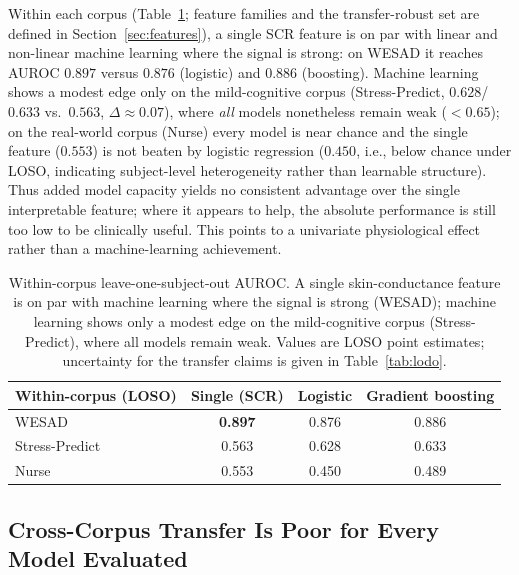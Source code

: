 \documentclass[healthcare,article,submit,moreauthors,pdftex]{Definitions/mdpi}
\begin{document}
Within each corpus (Table~\ref{tab:within}; feature families and the
transfer-robust set are defined in Section~\ref{sec:features}), a single SCR
feature is on par with
linear and non-linear machine learning where the signal is strong: on WESAD it
reaches AUROC $0.897$ versus $0.876$ (logistic) and $0.886$ (boosting). Machine
learning shows a modest edge only on the mild-cognitive corpus (Stress-Predict,
$0.628$/$0.633$ vs.\ $0.563$, $\Delta\approx0.07$), where \emph{all} models
nonetheless remain weak ($<0.65$); on the real-world corpus (Nurse) every model
is near chance and the single feature ($0.553$) is not beaten by logistic
regression ($0.450$, i.e., below chance under LOSO, indicating subject-level
heterogeneity rather than learnable structure). Thus added model capacity yields
no consistent advantage over the single interpretable feature; where it appears
to help, the absolute performance is still too low to be clinically useful. This
points to a univariate physiological effect rather than a machine-learning
achievement.

\begin{table}[H]
\centering
\caption{Within-corpus leave-one-subject-out AUROC. A single skin-conductance
feature is on par with machine learning where the signal is strong (WESAD);
machine learning shows only a modest edge on the mild-cognitive corpus
(Stress-Predict), where all models remain weak. Values are LOSO point estimates;
uncertainty for the transfer claims is given in Table~\ref{tab:lodo}.\label{tab:within}}
\begin{tabular}{lccc}
\toprule
\textbf{Within-corpus (LOSO)} & \textbf{Single (SCR)} & \textbf{Logistic} & \textbf{Gradient boosting} \\
\midrule
WESAD          & \textbf{0.897} & 0.876 & 0.886 \\
Stress-Predict & 0.563 & 0.628 & 0.633 \\
Nurse          & 0.553 & 0.450 & 0.489 \\
\bottomrule
\end{tabular}
\end{table}

\subsection{Cross-Corpus Transfer Is Poor for Every Model Evaluated}
\end{document}
